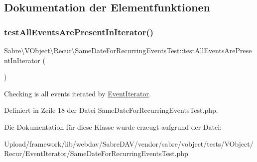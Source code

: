 \subsection{Dokumentation der Elementfunktionen}
\mbox{\label{class_sabre_1_1_v_object_1_1_recur_1_1_same_date_for_recurring_events_test_afad143de25ac3338f7c1de111795f804}} 
\subsubsection{\texorpdfstring{test\+All\+Events\+Are\+Present\+In\+Iterator()}{testAllEventsArePresentInIterator()}}
{\footnotesize\ttfamily Sabre\textbackslash{}\+V\+Object\textbackslash{}\+Recur\textbackslash{}\+Same\+Date\+For\+Recurring\+Events\+Test\+::test\+All\+Events\+Are\+Present\+In\+Iterator (\begin{DoxyParamCaption}{ }\end{DoxyParamCaption})}

Checking is all events iterated by \mbox{\hyperlink{class_sabre_1_1_v_object_1_1_recur_1_1_event_iterator}{Event\+Iterator}}. 

Definiert in Zeile 18 der Datei Same\+Date\+For\+Recurring\+Events\+Test.\+php.



Die Dokumentation für diese Klasse wurde erzeugt aufgrund der Datei\+:\begin{DoxyCompactItemize}
\item 
Upload/framework/lib/webdav/\+Sabre\+D\+A\+V/vendor/sabre/vobject/tests/\+V\+Object/\+Recur/\+Event\+Iterator/Same\+Date\+For\+Recurring\+Events\+Test.\+php\end{DoxyCompactItemize}
